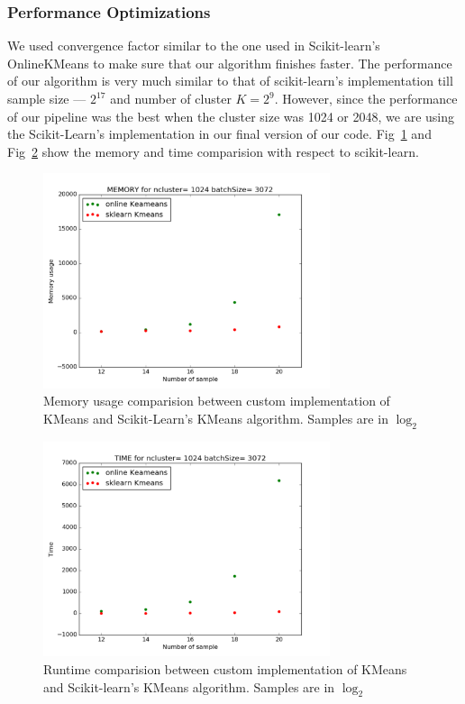 \documentclass[final,leqno,onefignum,onetabnum]{siamltexmm}
\begin{document}
\subsubsection{Performance Optimizations}
We used convergence factor similar to the one used in Scikit-learn's OnlineKMeans to make sure that our algorithm finishes faster.  The performance of our algorithm is very much similar to that of scikit-learn's implementation till sample size --- $2^{17}$ and number of cluster $K = 2^{9}$.
However, since the performance of our pipeline was the best when the cluster size was 1024 or 2048, we are using the Scikit-Learn's implementation in our final version of our code.
Fig~\ref{fig:kmeans_memory} and Fig~\ref{fig:kmeans_time} show the memory and time comparision with respect to scikit-learn.
\begin{figure}
  \centering
  \includegraphics[width=0.75\textwidth]{images/kmeans_memory}
  \caption{Memory usage comparision between custom implementation of KMeans and Scikit-Learn's KMeans algorithm.  Samples are in $\log_{2}$\label{fig:kmeans_memory}} 
\end{figure}
\begin{figure}
  \centering
  \includegraphics[width=0.75\textwidth]{images/kmeans_time}
  \caption{Runtime comparision between custom implementation of KMeans and Scikit-learn's KMeans algorithm.  Samples are in $\log_{2}$\label{fig:kmeans_time}} 
\end{figure}
\end{document}
